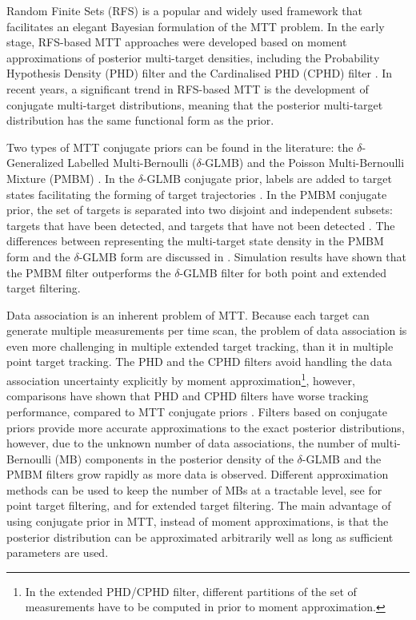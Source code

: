 \documentclass[journal]{IEEEtran}
\begin{document}
Random Finite Sets (RFS) \cite{rfs} is a popular and widely used framework that facilitates an elegant Bayesian formulation of the MTT problem. In the early stage, RFS-based MTT approaches were developed based on moment approximations of posterior multi-target densities, including the Probability Hypothesis Density (PHD) filter \cite{phdpoint,phdextended2,phdextended3} and the Cardinalised PHD (CPHD) filter \cite{cphdpoint,cphdextended}. In recent years, a significant trend in RFS-based MTT is the development of conjugate multi-target distributions, meaning that the posterior multi-target distribution has the same functional form as the prior. 

Two types of MTT conjugate priors can be found in the literature: the $\delta$-Generalized Labelled Multi-Bernoulli ($\delta$-GLMB) \cite{glmbconjugateprior} and the Poisson Multi-Bernoulli Mixture (PMBM) \cite{pmbmpoint}. In the $\delta$-GLMB conjugate prior, labels are added to target states facilitating the forming of target trajectories \cite{glmbconjugateprior}. In the PMBM conjugate prior, the set of targets is separated into two disjoint and independent subsets: targets that have been detected, and targets that have not been detected \cite{pmbmpoint}. The differences between representing the multi-target state density in the PMBM form and the $\delta$-GLMB form are discussed in \cite{pmbmpoint2}. Simulation results have shown that the PMBM filter \cite{pmbmpoint,pmbmpoint2,pmbmextended,pmbmextended2} outperforms the $\delta$-GLMB filter \cite{glmbpoint,lmbextended} for both point \cite{performanceevaluation} and extended \cite{pmbmextended2} target filtering. 

Data association is an inherent problem of MTT. Because each target can generate multiple measurements per time scan, the problem of data association is even more challenging in multiple extended target tracking, than it in multiple point target tracking. The PHD and the CPHD filters avoid handling the data association uncertainty explicitly by moment approximation\footnote{In the extended PHD/CPHD filter, different partitions of the set of measurements have to be computed in prior to moment approximation.}, however, comparisons have shown that PHD and CPHD filters have worse tracking performance, compared to MTT conjugate priors \cite{lmbextended,pmbmextended2}. Filters based on conjugate priors provide more accurate approximations to the exact posterior distributions, however, due to the unknown number of data associations, the number of multi-Bernoulli (MB) components in the posterior density of the $\delta$-GLMB and the PMBM filters grow rapidly as more data is observed. Different approximation methods can be used to keep the number of MBs at a tractable level, see \cite{glmbpoint,pmbmpoint2} for point target filtering, and \cite{lmbextended,pmbmextended,pmbmextended2} for extended target filtering. The main advantage of using conjugate prior in MTT, instead of moment approximations, is that the posterior distribution can be approximated arbitrarily well as long as sufficient parameters are used. 
\end{document}

